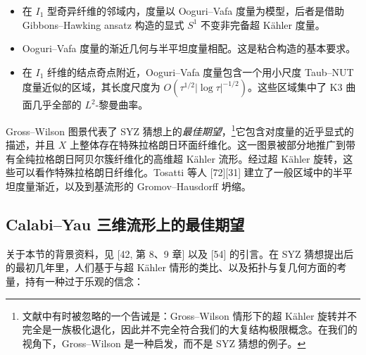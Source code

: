 


\begin{itemize}
\item 在 $I_1$ 型奇异纤维的邻域内，度量以 Ooguri--Vafa 度量为模型，后者是借助 Gibbons--Hawking ansatz 构造的显式 $S^1$ 不变非完备超 Kähler 度量。
\item Ooguri--Vafa 度量的渐近几何与半平坦度量相配。这是粘合构造的基本要求。
\item 在 $I_1$ 纤维的结点奇点附近，Ooguri--Vafa 度量包含一个用小尺度 Taub--NUT 度量近似的区域，其长度尺度为 $O(\tau^{1/2}|\log\tau|^{-1/2})$。这些区域集中了 K3 曲面几乎全部的 $L^2$-黎曼曲率。
\end{itemize}

Gross--Wilson 图景代表了 SYZ 猜想上的\emph{最佳期望}，\footnote{文献中有时被忽略的一个告诫是：Gross--Wilson 情形下的超 Kähler 旋转并不完全是一族极化退化，因此并不完全符合我们的大复结构极限概念。在我们的视角下，Gross--Wilson 是一种启发，而不是 SYZ 猜想的例子。}它包含对度量的近乎显式的描述，并且 $X$ 上整体存在特殊拉格朗日环面纤维化。这一图景被部分地推广到带有全纯拉格朗日阿贝尔簇纤维化的高维超 Kähler 流形。经过超 Kähler 旋转，这些可以看作特殊拉格朗日纤维化。Tosatti 等人 [72][31] 建立了一般区域中的半平坦度量渐近，以及到基流形的 Gromov--Hausdorff 坍缩。

\subsection{Calabi--Yau 三维流形上的最佳期望}

关于本节的背景资料，见 [42, 第 8、9 章] 以及 [54] 的引言。在 SYZ 猜想提出后的最初几年里，人们基于与超 Kähler 情形的类比、以及拓扑与复几何方面的考量，持有一种过于乐观的信念：


